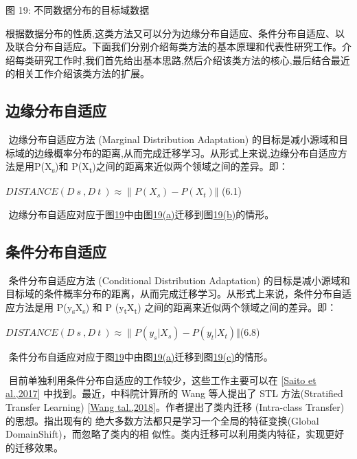 图 19: 不同数据分布的目标域数据

​
根据数据分布的性质,这类方法又可以分为边缘分布自适应、条件分布自适应、以及联合分布自适应。下面我们分别介绍每类方法的基本原理和代表性研究工作。介绍每类研究工作时,我们首先给出基本思路,然后介绍该类方法的核心,最后结合最近的相关工作介绍该类方法的扩展。

\subsection{边缘分布自适应}\label{ux8fb9ux7f18ux5206ux5e03ux81eaux9002ux5e94}

​ 边缘分布自适应方法 (Marginal Distribution Adaptation)
的目标是减小源域和目标域的边缘概率分布的距离,从而完成迁移学习。从形式上来说,边缘分布自适应方法是用P(X\textsubscript{s})和
P(X\textsubscript{t})之间的距离来近似两个领域之间的差异。即：

​ \(DISTANCE(D~s~,D~t~)\approx\lVert P(X_s)-P(X_t)\Vert\) (6.1)

​
边缘分布自适应对应于图\protect\hyperlink{bookmark84}{19}中由图\protect\hyperlink{bookmark101}{19(a)}迁移到图\protect\hyperlink{bookmark83}{19(b)}的情形。

\subsection{条件分布自适应}\label{ux6761ux4ef6ux5206ux5e03ux81eaux9002ux5e94}

​ 条件分布自适应方法 (Conditional Distribution Adaptation)
的目标是减小源域和目标域的条件概率分布的距离，从而完成迁移学习。从形式上来说，条件分布自适应方法是用
P(y\textsubscript{s}\textbar{}X\textsubscript{s}) 和 P
(y\textsubscript{t}\textbar{}X\textsubscript{t})
之间的距离来近似两个领域之间的差异。即：

​ \(DISTANCE(D~s~,D~t~)\approx\lVert P(y_s|X_s)-P(y_t|X_t)\Vert\)(6.8)

​
条件分布自适应对应于图\protect\hyperlink{bookmark84}{19}中由图\protect\hyperlink{bookmark101}{19(a)}迁移到图\protect\hyperlink{bookmark85}{19(c)}的情形。

​ 目前单独利用条件分布自适应的工作较少，这些工作主要可以在
{[}\protect\hyperlink{bookmark292}{Saito et al.,2017}{]}
中找到。最近，中科院计算所的 Wang 等人提出了 STL 方法(Stratified
Transfer Learn­ing) {[}\protect\hyperlink{bookmark309}{Wang
tal.,2018}{]}。作者提出了类内迁移 (Intra-class
Transfer)的思想。指出现有的
绝大多数方法都只是学习一个全局的特征变换(Global
DomainShift)，而忽略了类内的相
似性。类内迁移可以利用类内特征，实现更好的迁移效果。

